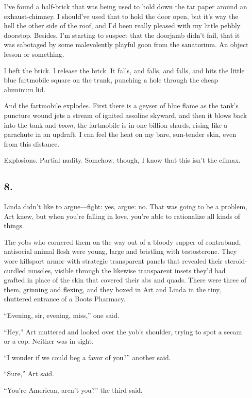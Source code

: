 I’ve found a half-brick that was being used to hold down the tar
paper around an exhaust-chimney. I should’ve used that to hold the
door open, but it’s way the hell the other side of the roof, and
I’d been really pleased with my little pebbly doorstop. Besides,
I’m starting to suspect that the doorjamb didn’t fail, that it was
sabotaged by some malevolently playful goon from the sanatorium. An
object lesson or something.

I heft the brick. I release the brick. It falls, and falls, and
falls, and hits the little blue fartmobile square on the trunk,
punching a hole through the cheap aluminum lid.

And the fartmobile explodes. First there is a geyser of blue flame
as the tank’s puncture wound jets a stream of ignited assoline
skyward, and then it blows back into the tank and \emph{boom}, the
fartmobile is in one billion shards, rising like a parachute in an
updraft. I can feel the heat on my bare, sun-tender skin, even from
this distance.

Explosions. Partial nudity. Somehow, though, I know that this isn’t
the climax.

\subsection{8.}

Linda didn’t like to argue—fight: yes, argue: no. That was going to
be a problem, Art knew, but when you’re falling in love, you’re
able to rationalize all kinds of things.

The yobs who cornered them on the way out of a bloody supper of
contraband, antisocial animal flesh were young, large and bristling
with testosterone. They wore killsport armor with strategic
transparent panels that revealed their steroid-curdled muscles,
visible through the likewise transparent insets they’d had grafted
in place of the skin that covered their abs and quads. There were
three of them, grinning and flexing, and they boxed in Art and
Linda in the tiny, shuttered entrance of a Boots Pharmacy.

“Evening, sir, evening, miss,” one said.

“Hey,” Art muttered and looked over the yob’s shoulder, trying to
spot a secam or a cop. Neither was in sight.

“I wonder if we could beg a favor of you?” another said.

“Sure,” Art said.

“You’re American, aren’t you?” the third said.

